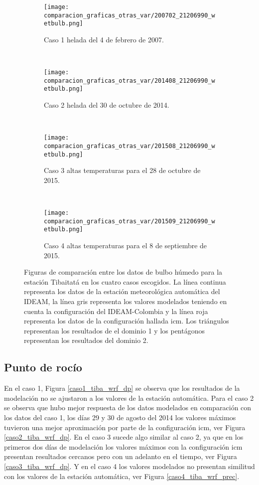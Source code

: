 \begin{figure}[H]
    
\begin{subfigure}[normla]{0.4\textwidth}
\caption{Caso 1 helada del 4 de febrero de 2007.}
\label{caso1_tiba_wrf_wb}
\texttt{[image: comparacion\_graficas\_otras\_var/200702\_21206990\_wetbulb.png]}
\end{subfigure}
~
\begin{subfigure}[normla]{0.4\textwidth}
\caption{Caso 2 helada del 30 de octubre de 2014.}
\label{caso2_tiba_wrf_wb}
\texttt{[image: comparacion\_graficas\_otras\_var/201408\_21206990\_wetbulb.png]}
\end{subfigure}
~
\centering
\begin{subfigure}[normla]{0.4\textwidth}
\caption{Caso 3 altas temperaturas para el 28 de octubre de 2015.}
\label{caso3_tiba_wrf_wb}
\texttt{[image: comparacion\_graficas\_otras\_var/201508\_21206990\_wetbulb.png]}
\end{subfigure}
~
\centering
\begin{subfigure}[normla]{0.4\textwidth}
\caption{Caso 4 altas temperaturas para el 8 de septiembre de 2015.}
\label{caso4_tiba_wrf_wb}
\texttt{[image: comparacion\_graficas\_otras\_var/201509\_21206990\_wetbulb.png]}
\end{subfigure}

    \caption{Figuras de comparación entre los datos de bulbo húmedo para la estación Tibaitatá en los cuatro casos escogidos. La línea continua representa los datos de la estación meteorológica automática del IDEAM, la línea gris representa los valores modelados teniendo en cuenta la configuración del IDEAM-Colombia y la línea roja representa los datos de la configuración hallada icm. Los triángulos representan los resultados de el dominio 1 y los pentágonos representan los resultados del dominio 2.}
    \label{fig:wrf_wb_tibaitata}
\end{figure}


\subsection{Punto de rocío}

En el caso 1, Figura \ref{caso1_tiba_wrf_dp} se observa que los resultados de la modelación no se ajustaron a los valores de la estación automática. Para el caso 2 se observa que hubo mejor respuesta de los datos modelados en comparación con los datos del caso 1, los días 29 y 30 de agosto del 2014 los valores máximos tuvieron una mejor aproximación por parte de la configuración icm, ver Figura \ref{caso2_tiba_wrf_dp}. En el caso 3 sucede algo similar al caso 2, ya que en los primeros dos días de modelación los valores máximos con la configuración icm presentan resultados cercanos pero con un adelanto en el tiempo, ver Figura \ref{caso3_tiba_wrf_dp}. Y en el caso 4 los valores modelados no presentan similitud con los valores de la estación automática, ver Figura \ref{caso4_tiba_wrf_prec}.\\



